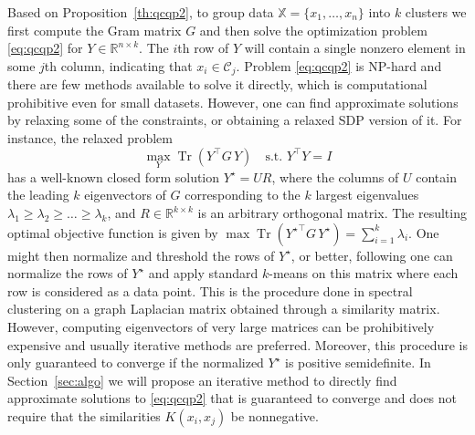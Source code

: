 \documentclass[aps,preprint,nofootinbib,floatfix]{revtex4-1}
\DeclareMathOperator{\Tr}{Tr}
\newcommand\kk{K}
\newcommand\C{{\mathcal{C}}}
\newcommand\Zt{Y}
\begin{document}
Based on Proposition~\ref{th:qcqp2}, to group data
$\mathbb{X} = \{ x_1,\dotsc,x_n \}$
into  $k$ clusters we first compute the Gram matrix
$G$ and then 
solve the optimization problem \eqref{eq:qcqp2} for $\Zt \in
\mathbb{R}^{n\times k}$. The $i$th row
of $\Zt$ will contain a single nonzero element in some $j$th column,
indicating that $x_i \in \C_j$. 
Problem \eqref{eq:qcqp2} is NP-hard and there
are few methods
available to solve it directly,
which is computational prohibitive even for small datasets.
However, one can find approximate solutions by relaxing some 
of the constraints, or obtaining a relaxed SDP version of it.
For instance, the relaxed problem
\begin{equation}
\max_{Y} \Tr \left( Y^\top G \, Y \right) \quad \mbox{s.t. $Y^\top Y = I$}
\end{equation}
has a well-known closed form solution $Y^\star = U R$, where the
columns of $U$ contain the leading $k$ eigenvectors of $G$ corresponding
to the $k$ largest eigenvalues $\lambda_1\ge \lambda_2\ge\dotsc\ge\lambda_k$, 
and
$R \in \mathbb{R}^{k\times k}$ is an arbitrary orthogonal matrix. 
The resulting
optimal objective function is given by
$\max \Tr \left( {Y^\star}^\top G \, Y^\star \right)  = 
\sum_{i=1}^k \lambda_i$. One might then normalize and threshold the rows
of $Y^\star$,
or better, following \cite{NgJordan} one can normalize the
rows of $Y^\star$ and apply standard $k$-means on this matrix where each
row is considered as a data point.
This is the procedure done in spectral clustering on a graph Laplacian
matrix obtained through a similarity matrix.
However, computing eigenvectors of very large matrices
can be prohibitively expensive 
and usually iterative methods are preferred. Moreover,
this procedure is only guaranteed to converge if the normalized $Y^\star$ is
positive semidefinite.
In Section~\ref{sec:algo} we will propose an iterative method to directly 
find approximate solutions to \eqref{eq:qcqp2} that is guaranteed to
converge and does not require that the similarities $\kk(x_i,x_j)$ be
nonnegative.
\end{document}
